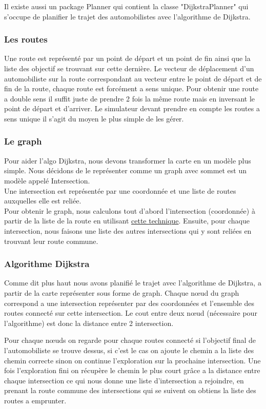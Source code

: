 \documentclass[12pt]{article}
\begin{document}
				Il existe aussi un package Planner qui contient la classe "DijkstraPlanner" qui s'occupe de planifier le trajet des automobilistes avec l'algorithme de Dijkstra.
			\subsubsection{Les routes}
				Une route est représenté par un point de départ et un point de fin ainsi que la liste des objectif se trouvant sur cette dernière. Le vecteur de déplacement d'un automobiliste sur la route correspondant au vecteur entre le point de départ et de fin de la route, chaque route est forcément a sens unique. Pour obtenir une route a double sens il suffit juste de prendre 2 fois la même route mais en inversant le point de départ et d'arriver. Le simulateur devant prendre en compte les routes a sens unique il s'agit du moyen le plus simple de les gérer.
			\subsubsection{Le graph}
			    Pour aider l’algo Dijkstra, nous devons transformer la carte en un modèle plus simple. Nous décidons de le représenter comme un graph avec sommet est un modèle appelé Intersection. \\
                Une intersection est représentée par une coordonnée et une liste de routes auxquelles elle est reliée. \\
                Pour obtenir le graph, nous calculons tout d’abord l’intersection (coordonnée) à partir de la liste de la route en utilisant \href{https://web.archive.org/web/20070923103445/http://local.wasp.uwa.edu.au/~pbourke/geometry/lineline2d/}{cette technique}. Ensuite, pour chaque intersection, nous faisons une liste des autres intersections qui y sont reliées en trouvant leur route commune.
			    
			\subsubsection{Algorithme Dijkstra}
				Comme dit plus haut nous avons planifié le trajet avec l'algorithme de Dijkstra, a partir de la carte représenter sous forme de graph. Chaque nœud du graph correspond a une intersection représenter par des coordonnées et l'ensemble des routes connecté sur cette intersection. Le cout entre deux nœud (nécessaire pour l'algorithme) est donc la distance entre 2 intersection.
				
				Pour chaque nœuds on regarde pour chaque routes connecté si l'objectif final de l'automobiliste se trouve dessus, si c'est le cas on ajoute le chemin a la liste des chemin correcte sinon on continue l'exploration sur la prochaine intersection. Une fois l'exploration fini on récupère le chemin le plus court grâce a la distance entre chaque intersection ce qui nous donne une liste d'intersection a rejoindre, en prenant la route commune des intersections qui se suivent on obtiens la liste des routes a emprunter.
\end{document}
